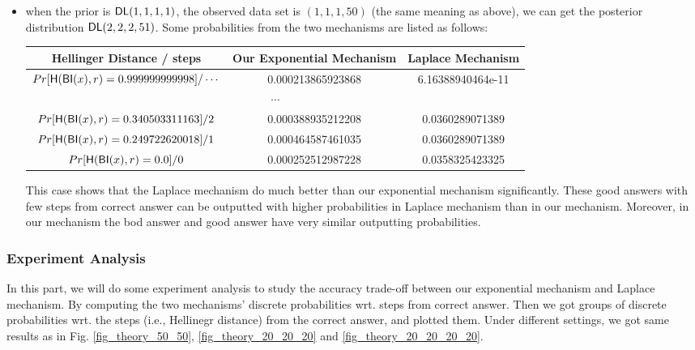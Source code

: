 \begin{itemize}
\begin{itemize}
		\item when the prior is $\mathsf{DL}(1,1,1,1)$, the observed data set is $(1,1,1,50)$ (the same meaning as above), we can get the posterior distribution $\mathsf{DL}(2,2,2,51)$. Some probabilities from the two mechanisms are listed as follows:
		\begin{center}
		 \begin{tabular}{c | c | c} 
		 \hline
		 Hellinger Distance / steps & Our Exponential Mechanism & Laplace Mechanism  \\
		 \hline\hline
		 $Pr[\mathsf{H}(\mathsf{BI}(x), r) = 0.999999999998] / \cdots 	$ & 0.000213865923868 & 6.16388940464e-11\\ 
		 \hline
		 \multicolumn{3}{c}{$\cdots$}  \\
		 \hline
		 $Pr[\mathsf{H}(\mathsf{BI}(x), r) = 0.340503311163] / 2		$ & 0.000388935212208 & 0.0360289071389 \\
		 \hline
		 $Pr[\mathsf{H}(\mathsf{BI}(x), r) = 0.249722620018 ] / 1		$ & 0.000464587461035 & 0.0360289071389  \\
		 \hline
		 $Pr[\mathsf{H}(\mathsf{BI}(x), r) = 0.0 ] / 0 					$ & 0.000252512987228 & 0.0358325423325 \\
		 \hline
		\end{tabular}
		\end{center}

		This case shows that the Laplace mechanism do much better than our exponential mechanism significantly. These good answers with few steps from correct answer can be outputted with higher probabilities in Laplace mechanism than in our mechanism. Moreover, in our mechanism the bod answer and good answer have very similar outputting probabilities.

	\end{itemize}  

\end{itemize}


\subsubsection{Experiment Analysis}
In this part, we will do some experiment analysis to study the accuracy trade-off between our exponential mechanism and Laplace mechanism. By computing the two mechanisms' discrete probabilities wrt. steps from correct answer. Then we got groups of discrete probabilities wrt. the steps (i.e., Hellinegr distance) from the correct answer, and plotted them. Under different settings, we got same results as in Fig. \ref{fig_theory_50_50}, \ref{fig_theory_20_20_20} and \ref{fig_theory_20_20_20_20}. 

